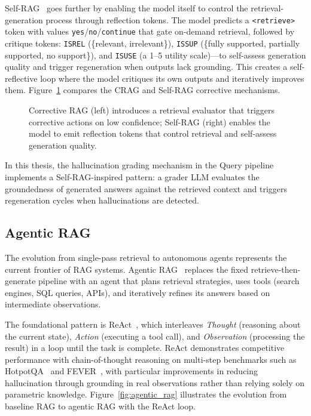 Self-RAG~\cite{asai2023selfraglearningretrievegenerate} goes further by enabling the model itself to control the retrieval-generation process through reflection tokens. The model predicts a \texttt{<retrieve>} token with values \texttt{yes}/\texttt{no}/\texttt{continue} that gate on-demand retrieval, followed by critique tokens: \texttt{ISREL} (\{relevant, irrelevant\}), \texttt{ISSUP} (\{fully supported, partially supported, no support\}), and \texttt{ISUSE} (a 1--5 utility scale)---to self-assess generation quality and trigger regeneration when outputs lack grounding. This creates a self-reflective loop where the model critiques its own outputs and iteratively improves them. Figure~\ref{fig:crag_selfrag} compares the CRAG and Self-RAG corrective mechanisms.

\begin{figure}[htbp]
\centering
{}
\caption{Corrective RAG (left) introduces a retrieval evaluator that triggers corrective actions on low confidence; Self-RAG (right) enables the model to emit reflection tokens that control retrieval and self-assess generation quality.}
\label{fig:crag_selfrag}
\end{figure}

In this thesis, the hallucination grading mechanism in the Query pipeline implements a Self-RAG-inspired pattern: a grader LLM evaluates the groundedness of generated answers against the retrieved context and triggers regeneration cycles when hallucinations are detected.

\subsection{Agentic RAG}
\label{sec:rw:agentic_rag}

The evolution from single-pass retrieval to autonomous agents represents the current frontier of RAG systems. Agentic RAG~\cite{singh2026agenticretrievalaugmentedgenerationsurvey} replaces the fixed retrieve-then-generate pipeline with an agent that plans retrieval strategies, uses tools (search engines, SQL queries, APIs), and iteratively refines its answers based on intermediate observations.

The foundational pattern is ReAct~\cite{yao2023reactsynergizingreasoningacting}, which interleaves \emph{Thought} (reasoning about the current state), \emph{Action} (executing a tool call), and \emph{Observation} (processing the result) in a loop until the task is complete. ReAct demonstrates competitive performance with chain-of-thought reasoning on multi-step benchmarks such as HotpotQA~\cite{yang2018hotpotqa} and FEVER~\cite{thorne2018fever}, with particular improvements in reducing hallucination through grounding in real observations rather than relying solely on parametric knowledge. Figure~\ref{fig:agentic_rag} illustrates the evolution from baseline RAG to agentic RAG with the ReAct loop.

